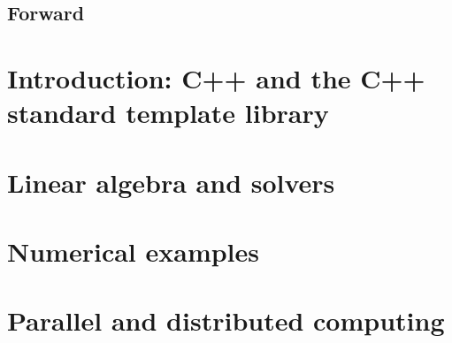 \documentclass[11pt,fleqn]{book} %
\begin{document}
\tableofcontents %

\cleardoublepage %

\pagestyle{fancy} %

\chapter*{Forward}


\part{Introduction: C++ and the C++ standard template library}




\part{Linear algebra and solvers}



\part{Numerical examples}
\label{part:numerical:examples}



\part{Parallel and distributed computing}
\end{document}
